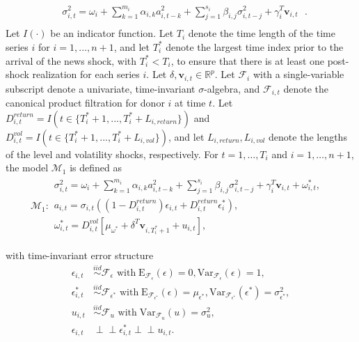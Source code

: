 \documentclass[11pt,3p,review,authoryear]{elsarticle}
\newcommand{\x}{\textbf{v}}
\newcommand{\simiid}{\stackrel{iid}{\sim}} %
\newcommand{\indep}{\perp \!\!\! \perp } %
\def\mrm#1{\mathrm{#1}} %
\def\mc#1{\mathcal{#1}} %
\def\mc#1{\mathcal{#1}}
\theoremstyle{definition}
\begin{document}
\begin{align*}
&\sigma_{i,t}^{2} = \omega_{i} + \sum^{m_{i}}_{k=1}\alpha_{i,k}a^{2}_{i,t-k} + \sum_{j=1}^{s_{i}}\beta_{i,j}\sigma_{i,t-j}^{2} + \gamma_{i}^{T} \x_{i,t} \text{ }. \\
\end{align*}
Let $I(\cdot)$ be an indicator function.  Let $T_i$ denote the time length of the time series $i$ for $i = 1, \ldots, n+1$, and let $T_i^*$ denote the largest time index prior to the arrival of the news shock, with $T_i^* < T_i$, to ensure that there is at least one post-shock realization for each series $i$.  Let $\delta, \x_{i,t} \in \mathbb{R}^{p}$.  Let $\mathcal{F}_{i}$ with a single-variable subscript denote a univariate, time-invariant $\sigma$-algebra, and $\mathcal{F}_{i,t}$ denote the canonical product filtration for donor $i$ at time $t$.  Let $D^{return}_{i,t} = I(t \in \{T_i^* + 1,...,T_i^* + L_{i, return}\})$ and $D^{vol}_{i,t} = I(t \in \{T_i^* + 1,...,T_i^* + L_{i, vol}\})$, and let $L_{i,return},L_{i,vol}$ denote the lengths of the level and volatility shocks, respectively.  For $t= 1, \ldots, T_i$ and $i = 1, \ldots, n+1$, the model $\mc{M}_1$ is defined as 
\begin{align*}
  \mc{M}_1 \colon \begin{array}{l}
     \sigma^{2}_{i,t} = \omega_{i} + \sum^{m_{i}}_{k=1}\alpha_{i,k}a^{2}_{i,t-k} + \sum_{j=1}^{s_{i}}\beta_{i,j}\sigma_{i,t-j}^{2} + \gamma_{i}^{T} \x_{i,t} + \omega^{*}_{i,t}, \text{ }\\[.2cm]
     a_{i,t} = \sigma_{i,t}((1-D^{return}_{i,t})\epsilon_{i,t} + D^{return}_{i,t}\epsilon^{*}_{i}),\\[.2cm]
    \omega_{i,t}^{*} = D^{vol}_{i,t}[\mu_{\omega^{*}}+\delta^{T}\x_{i,T^{*}_{i}+1}+ u_{i,t}],
  \end{array}
  \end{align*}

with time-invariant error structure
  \begin{align*}
    \epsilon_{i,t} &\simiid \mc{F}_{\epsilon} \text{ with}  \; \mrm{E}_{\mc{F}_{\epsilon}}(\epsilon) = 0, \mrm{Var}_{\mc{F}_{\epsilon}}(\epsilon)  = 1,  \\
    \epsilon^{*}_{i,t} &\simiid \mc{F}_{\epsilon^{*}} \text{ with}  \; \mrm{E}_{\mc{F}_{\epsilon^{*}}}(\epsilon) = \mu_{\epsilon^{*}}, \mrm{Var}_{\mc{F}_{\epsilon^{*}}}(\epsilon^{*})  = \sigma^2_{\epsilon^{*}},  \\
    u_{i,t} & \simiid  \mc{F}_{u} \text{ with}  \; \mrm{Var}_{\mc{F}_{u}}(u) = \sigma^2_{u},\\
    \epsilon_{i,t} & \indep  \epsilon^{*}_{i,t}  \indep u_{i,t}.
    \end{align*}
\end{document}
